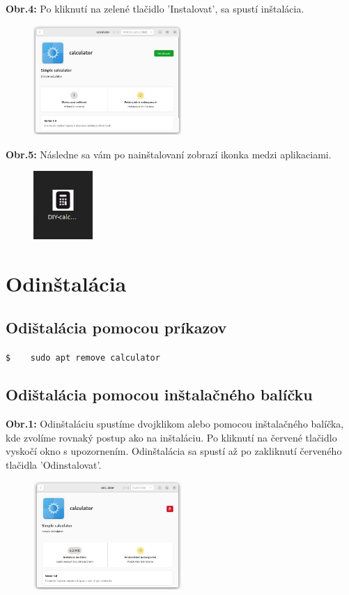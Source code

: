 \documentclass[11pt, a4paper]{article}
\begin{document}
\noindent \textbf{Obr.4:} Po kliknutí na zelené tlačidlo 'Instalovat', sa spustí inštalácia.
\begin{figure}[H]
    \centering
    \includegraphics[width=0.5\textwidth]{4.png}
    \label{fig:i4}
\end{figure}
\noindent \textbf{Obr.5:} Následne sa vám po nainštalovaní zobrazí ikonka medzi aplikaciami. 
\begin{figure}[H]
    \centering
    \includegraphics[width=0.2\textwidth]{5.png}
    \label{fig:i5}
\end{figure}

\newpage
\section{Odinštalácia}
\subsection{Odištalácia pomocou príkazov}
\verb|$    sudo apt remove calculator| \\
\subsection{Odištalácia pomocou inštalačného balíčku}
\textbf{Obr.1:} Odinštaláciu spustíme dvojklikom alebo pomocou inštalačného balíčka, kde zvolíme rovnaký postup ako na inštaláciu. Po kliknutí na červené tlačidlo vyskočí okno s upozornením. Odinštalácia sa spustí až po zakliknutí červeného tlačidla 'Odinstalovat'.
\begin{figure}[ H]
    \centering
    \includegraphics[width=0.5\textwidth]{u1.png}
    \label{fig:u1}
\end{figure}
\end{document}
